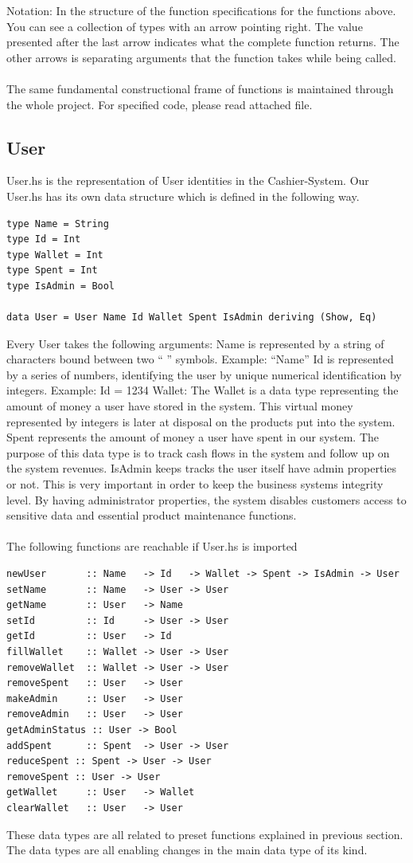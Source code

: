 \documentclass[11pt]{article}
\begin{document}
Notation: In the structure of the function specifications for the functions above. You can see a collection of types with an arrow pointing right. The value presented after the last arrow indicates what the complete function returns. The other arrows is separating arguments that the function takes while being called.
\\\\
The same fundamental constructional frame of functions is maintained through the whole project. For specified code, please read attached file.

\newpage
\subsection{User}
User.hs is the representation of User identities in the Cashier-System. Our User.hs has its own data structure which is defined in the following way.
\begin{lstlisting}
type Name = String
type Id = Int
type Wallet = Int
type Spent = Int
type IsAdmin = Bool

data User = User Name Id Wallet Spent IsAdmin deriving (Show, Eq)
\end{lstlisting}
Every User takes the following arguments:
Name is represented by a string of characters bound between two “ ” symbols.
Example: “Name”
Id is represented by a series of numbers, identifying the user by unique numerical identification by integers.
Example: Id = 1234
Wallet: The Wallet is a data type representing the amount of money a user have stored in the system. This virtual money represented by integers is later at disposal on the products put into the system.
Spent represents the amount of money a user have spent in our system. The purpose of this data type is to track cash flows in the system and follow up on the system revenues.
IsAdmin keeps tracks the user itself have admin properties or not. This is very important in order to keep the business systems integrity level. By having administrator properties, the system disables customers access to sensitive data and essential product maintenance functions.
\\\\
The following functions are reachable if User.hs is imported\\
\begin{lstlisting}
newUser       :: Name   -> Id   -> Wallet -> Spent -> IsAdmin -> User
setName       :: Name   -> User -> User
getName       :: User   -> Name
setId         :: Id     -> User -> User
getId         :: User   -> Id
fillWallet    :: Wallet -> User -> User
removeWallet  :: Wallet -> User -> User
removeSpent   :: User   -> User
makeAdmin     :: User   -> User
removeAdmin   :: User   -> User
getAdminStatus :: User -> Bool
addSpent      :: Spent  -> User -> User
reduceSpent :: Spent -> User -> User
removeSpent :: User -> User
getWallet     :: User   -> Wallet
clearWallet   :: User   -> User
\end{lstlisting}
These data types are all related to preset functions explained in previous section.
The data types are all enabling changes in the main data type of its kind.
\end{document}
